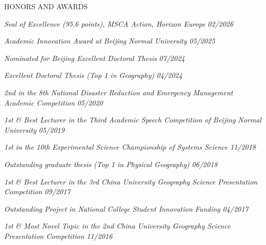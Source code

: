 \documentclass{resume} %
\newcommand{\awardentry}[3]{\textnormal{ \textit {#1}  \hfill {\em #2} #3}}
\begin{document}
\begin{rSection}{HONORS AND AWARDS} \itemsep -3pt

\awardentry{Seal of Excellence (95.6 points), MSCA Action, Horizon Europe}{02/2026}{}

\awardentry{Academic Innovation Award at Beijing Normal University}{05/2025}{}

\awardentry{Nominated for Beijing Excellent Doctoral Thesis}{07/2024}{}

\awardentry{Excellent Doctoral Thesis (Top 1 in Geography)}{04/2024}{}

\awardentry{2nd in the 8th National Disaster Reduction and Emergency Management Academic Competition} {05/2020}{}

\awardentry{1st \& Best Lecturer in the Third Academic Speech Competition of Beijing Normal University} {05/2019}{}

\awardentry{1st in the 10th Experimental Science Championship of Systems Science} {11/2018}{}

\awardentry{Outstanding graduate thesis (Top 1 in Physical Geography)} {06/2018}{}

\awardentry{1st \& Best Lecturer in the 3rd China University Geography Science Presentation Competition} {09/2017}{}

\awardentry{Outstanding Project in National College Student Innovation Funding} {04/2017}{}

\awardentry{1st \& Most Novel Topic in the 2nd China University Geography Science Presentation Competition} {11/2016}{}

\end{rSection}


\end{document}
